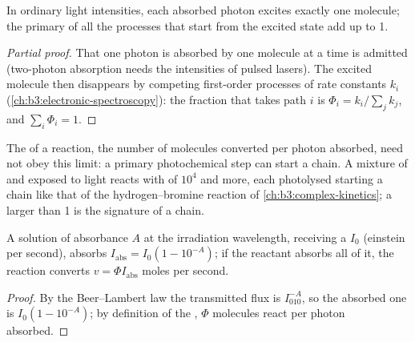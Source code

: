 \begin{proposition}\label{prop:b3:photochemistry:stark-einstein}
In ordinary light intensities, each absorbed photon excites exactly one
molecule; the primary  of all the processes that start from the
excited state add up to 1.
\end{proposition}

\begin{proof}[Partial proof]
That one photon is absorbed by one molecule at a time is admitted (two-photon
absorption needs the intensities of pulsed lasers). The excited molecule then
disappears by competing first-order processes of rate constants $k_i$
(\cref{ch:b3:electronic-spectroscopy}): the fraction that takes path $i$ is $\Phi_i =
k_i/\sum_jk_j$, and $\sum_i\Phi_i = 1$.
\end{proof}

The  of a reaction, the number of molecules converted per photon
absorbed, need not obey this limit: a primary photochemical step can start a
chain. A mixture of  and  exposed to light reacts with 
of $10^4$ and more, each photolysed  starting a chain like that of the
hydrogen--bromine reaction of \cref{ch:b3:complex-kinetics}; a 
larger than 1 is the signature of a chain.

\begin{proposition}\label{prop:b3:photochemistry:rate}
A solution of absorbance $A$ at the irradiation wavelength, receiving a  $I_0$ (einstein per second), absorbs $I_{\mathrm{abs}} = I_0(1 - 10^{-A})$; if the
reactant absorbs all of it, the reaction converts $v = \Phi I_{\mathrm{abs}}$ moles per second.
\end{proposition}

\begin{proof}
By the Beer--Lambert law the transmitted flux is $I_010^{-A}$, so the absorbed one
is $I_0(1 - 10^{-A})$; by definition of the , $\Phi$ molecules react per
photon absorbed.
\end{proof}

